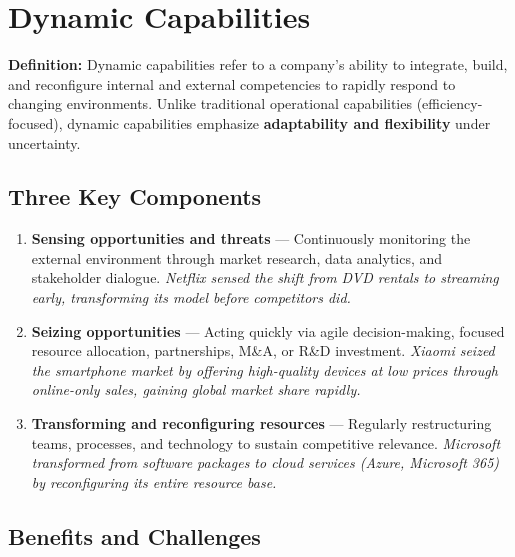\documentclass[11pt, letterpaper]{article}
\begin{document}
\newpage

\section{Dynamic Capabilities}

\begin{defbox}
\textbf{Definition:} Dynamic capabilities refer to a company's ability to integrate, build, and reconfigure internal and external competencies to rapidly respond to changing environments. Unlike traditional operational capabilities (efficiency-focused), dynamic capabilities emphasize \textbf{adaptability and flexibility} under uncertainty.
\end{defbox}

\subsection{Three Key Components}

\begin{enumerate}[leftmargin=*, label=\textbf{\arabic*.}]
  \item \textbf{Sensing opportunities and threats} --- Continuously monitoring the external environment through market research, data analytics, and stakeholder dialogue. \textit{Netflix sensed the shift from DVD rentals to streaming early, transforming its model before competitors did.}
  \item \textbf{Seizing opportunities} --- Acting quickly via agile decision-making, focused resource allocation, partnerships, M\&A, or R\&D investment. \textit{Xiaomi seized the smartphone market by offering high-quality devices at low prices through online-only sales, gaining global market share rapidly.}
  \item \textbf{Transforming and reconfiguring resources} --- Regularly restructuring teams, processes, and technology to sustain competitive relevance. \textit{Microsoft transformed from software packages to cloud services (Azure, Microsoft 365) by reconfiguring its entire resource base.}
\end{enumerate}

\subsection{Benefits and Challenges}
\end{document}
